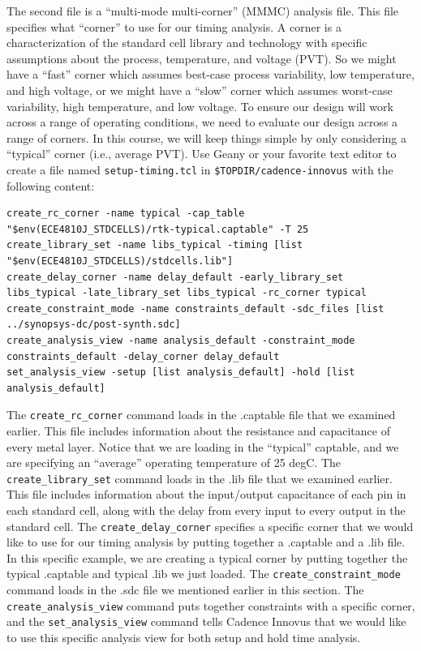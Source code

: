 \documentclass[a4paper,12pt,twoside]{article}
\begin{document}
The second file is a “multi-mode multi-corner” (MMMC) analysis file. This file specifies what “corner” to use for our timing analysis. A corner is a characterization of the standard cell library and technology with specific assumptions about the process, temperature, and voltage (PVT). So we might have a “fast” corner which assumes best-case process variability, low temperature, and high voltage, or we might have a “slow” corner which assumes worst-case variability, high temperature, and low voltage. To ensure our design will work across a range of operating conditions, we need to evaluate our design across a range of corners. In this course, we will keep things simple by only considering a “typical” corner (i.e., average PVT). Use Geany or your favorite text editor to create a file named \texttt{setup-timing.tcl} in \texttt{\$TOPDIR/cadence-innovus} with the following content:
\begin{verbatim}
create_rc_corner -name typical -cap_table "$env(ECE4810J_STDCELLS)/rtk-typical.captable" -T 25
create_library_set -name libs_typical -timing [list "$env(ECE4810J_STDCELLS)/stdcells.lib"]
create_delay_corner -name delay_default -early_library_set libs_typical -late_library_set libs_typical -rc_corner typical
create_constraint_mode -name constraints_default -sdc_files [list ../synopsys-dc/post-synth.sdc]
create_analysis_view -name analysis_default -constraint_mode constraints_default -delay_corner delay_default
set_analysis_view -setup [list analysis_default] -hold [list analysis_default]
\end{verbatim}
The \texttt{create\_rc\_corner} command loads in the .captable file that we examined earlier. This file includes information about the resistance and capacitance of every metal layer. Notice that we are loading in the “typical” captable, and we are specifying an “average” operating temperature of 25 degC. The \texttt{create\_library\_set} command loads in the .lib file that we examined earlier. This file includes information about the input/output capacitance of each pin in each standard cell, along with the delay from every input to every output in the standard cell. The \texttt{create\_delay\_corner} specifies a specific corner that we would like to use for our timing analysis by putting together a .captable and a .lib file. In this specific example, we are creating a typical corner by putting together the typical .captable and typical .lib we just loaded. The \texttt{create\_constraint\_mode} command loads in the .sdc file we mentioned earlier in this section. The \texttt{create\_analysis\_view} command puts together constraints with a specific corner, and the \texttt{set\_analysis\_view} command tells Cadence Innovus that we would like to use this specific analysis view for both setup and hold time analysis.
\end{document}
